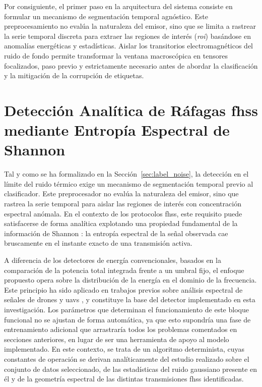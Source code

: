 Por consiguiente, el primer paso en la arquitectura del sistema consiste en formular un mecanismo de segmentación temporal agnóstico. Este preprocesamiento no evalúa la naturaleza del emisor, sino que se limita a rastrear la serie temporal discreta para extraer las regiones de interés (\textit{\gls{roi}}) basándose en anomalías energéticas y estadísticas. Aislar los transitorios electromagnéticos del ruido de fondo permite transformar la ventana macroscópica en tensores focalizados, paso previo y estrictamente necesario antes de abordar la clasificación y la mitigación de la corrupción de etiquetas.

\section{Detección Analítica de Ráfagas \gls{fhss} mediante Entropía Espectral de Shannon}
\label{sec:detector_entropia}

Tal y como se ha formalizado en la Sección~\ref{sec:label_noise}, la detección en el límite del ruido térmico exige un mecanismo de segmentación temporal previo al clasificador. Este preprocesador no evalúa la naturaleza del emisor, sino que rastrea la serie temporal para aislar las regiones de interés con concentración espectral anómala. En el contexto de los protocolos \gls{fhss}, este requisito puede satisfacerse de forma analítica explotando una propiedad fundamental de la información de Shannon \cite{zhang_entropy-based_1989}: la entropía espectral de la señal observada cae bruscamente en el instante exacto de una transmisión activa.

A diferencia de los detectores de energía convencionales, basados en la comparación de la potencia total integrada frente a un umbral fijo, el enfoque propuesto opera sobre la distribución de la energía en el dominio de la frecuencia. Este principio ha sido aplicado en trabajos previos sobre análisis espectral de señales de drones y \gls{uav}s \cite{morge-rollet_drone_2022, li_dim_2025}, y constituye la base del detector implementado en esta investigación. Los parámetros que determinan el funcionamiento de este bloque funcional no se ajustan de forma automática, ya que esto supondría una fase de entrenamiento adicional que arrastraría todos los problemas comentados en secciones anteriores, en lugar de ser una herramienta de apoyo al modelo implementado. En este contexto, se trata de un algoritmo determinista, cuyas constantes de operación se derivan analíticamente del estudio realizado sobre el conjunto de datos seleccionado, de las estadísticas del ruido gaussiano presente en él y de la geometría espectral de las distintas transmisiones \gls{fhss} identificadas.

